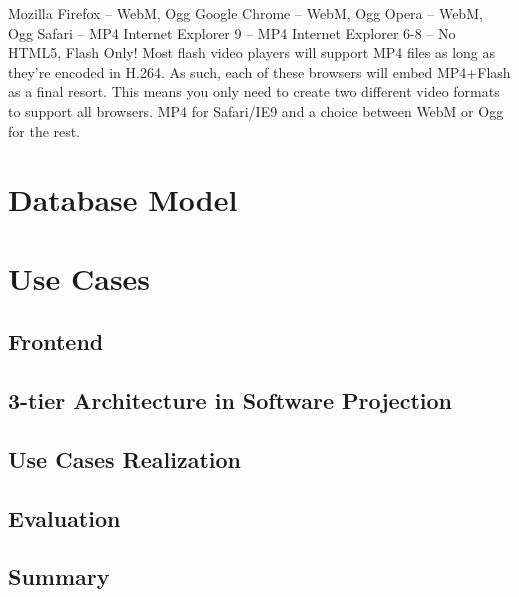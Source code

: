 	Mozilla Firefox – WebM, Ogg
	Google Chrome – WebM, Ogg
	Opera – WebM, Ogg
	Safari – MP4
	Internet Explorer 9 – MP4
	Internet Explorer 6-8 – No HTML5, Flash Only!
	Most flash video players will support MP4 files as long as they’re encoded in H.264. As such, each of these browsers will embed MP4+Flash as a final resort. This means you only need to create two different video formats to support all browsers. MP4 for Safari/IE9 and a choice between WebM or Ogg for the rest.

\section{Database Model}

\section{Use Cases}

  \subsection{Frontend}
  \subsection{3-tier Architecture in Software Projection}
    \subsection{Use Cases Realization}
  \subsection{Evaluation}


\subsection{Summary}